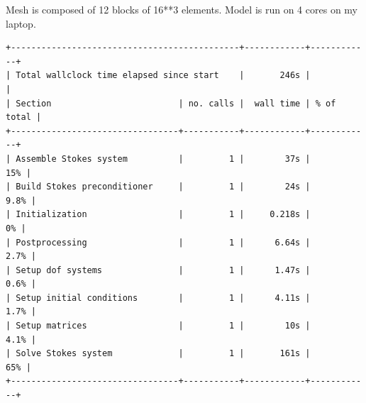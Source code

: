 Mesh is composed of 12 blocks of 16**3 elements.
Model is run on 4 cores on my laptop.

\begin{verbatim}
+---------------------------------------------+------------+------------+
| Total wallclock time elapsed since start    |       246s |            |
| Section                         | no. calls |  wall time | % of total |
+---------------------------------+-----------+------------+------------+
| Assemble Stokes system          |         1 |        37s |        15% |
| Build Stokes preconditioner     |         1 |        24s |       9.8% |
| Initialization                  |         1 |     0.218s |         0% |
| Postprocessing                  |         1 |      6.64s |       2.7% |
| Setup dof systems               |         1 |      1.47s |       0.6% |
| Setup initial conditions        |         1 |      4.11s |       1.7% |
| Setup matrices                  |         1 |        10s |       4.1% |
| Solve Stokes system             |         1 |       161s |        65% |
+---------------------------------+-----------+------------+------------+
\end{verbatim}

